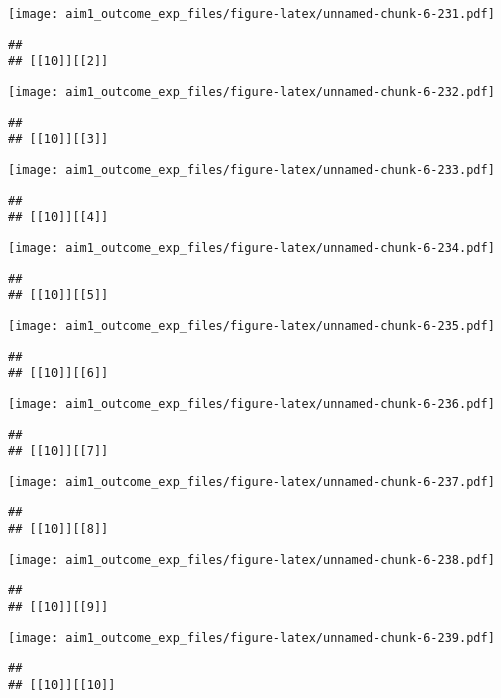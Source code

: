 \documentclass[
]{article}
\begin{document}
\texttt{[image: aim1\_outcome\_exp\_files/figure-latex/unnamed-chunk-6-231.pdf]}

\begin{verbatim}
## 
## [[10]][[2]]
\end{verbatim}

\texttt{[image: aim1\_outcome\_exp\_files/figure-latex/unnamed-chunk-6-232.pdf]}

\begin{verbatim}
## 
## [[10]][[3]]
\end{verbatim}

\texttt{[image: aim1\_outcome\_exp\_files/figure-latex/unnamed-chunk-6-233.pdf]}

\begin{verbatim}
## 
## [[10]][[4]]
\end{verbatim}

\texttt{[image: aim1\_outcome\_exp\_files/figure-latex/unnamed-chunk-6-234.pdf]}

\begin{verbatim}
## 
## [[10]][[5]]
\end{verbatim}

\texttt{[image: aim1\_outcome\_exp\_files/figure-latex/unnamed-chunk-6-235.pdf]}

\begin{verbatim}
## 
## [[10]][[6]]
\end{verbatim}

\texttt{[image: aim1\_outcome\_exp\_files/figure-latex/unnamed-chunk-6-236.pdf]}

\begin{verbatim}
## 
## [[10]][[7]]
\end{verbatim}

\texttt{[image: aim1\_outcome\_exp\_files/figure-latex/unnamed-chunk-6-237.pdf]}

\begin{verbatim}
## 
## [[10]][[8]]
\end{verbatim}

\texttt{[image: aim1\_outcome\_exp\_files/figure-latex/unnamed-chunk-6-238.pdf]}

\begin{verbatim}
## 
## [[10]][[9]]
\end{verbatim}

\texttt{[image: aim1\_outcome\_exp\_files/figure-latex/unnamed-chunk-6-239.pdf]}

\begin{verbatim}
## 
## [[10]][[10]]
\end{verbatim}
\end{document}
